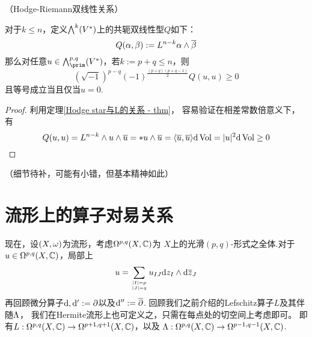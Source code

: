 \begin{thm}（Hodge-Riemann双线性关系）
\label{HRR-局部-thm}

对于$k\leq n$，定义$\bigwedge\nolimits^{k}(V^*)$上的共轭双线性型$Q$如下：
$$Q(\alpha,\beta):=L^{n-k}\alpha\wedge\overline{\beta}$$
那么对任意$u\in \wedgeform{p,q}_{\prim}(V^*)$，若$k:=p+q\leq n$，则
$$(\sqrt{-1})^{p-q}(-1)^{\frac{(p+q)(p+q-1)}{2}}Q(u,u)\geq 0$$
且等号成立当且仅当$u=0$.
\end{thm}

\begin{proof}利用定理\ref{Hodge star与L的关系 - thm}，
容易验证在相差常数倍意义下，有%
$$Q(u,u)=L^{n-k}\wedge u\wedge\overline{u}
=*u\wedge\overline{u}=\langle\overline{u},\overline{u}\rangle\mathrm{d}\operatorname{Vol}
=|u|^2\mathrm{d}\operatorname{Vol}\geq 0$$%
\end{proof}

{\color{blue}（细节待补，可能有小错，但基本精神如此）}



\section{\Kahler 流形上的算子对易关系}


现在，设$(X,\omega)$为\Kahler 流形，考虑$\Omega^{p,q}(X,\mathbb{C})$为
$X$上的光滑$(p,q)$-形式之全体.对于$u\in\Omega^{p,q}(X,\mathbb{C})$，局部上
$$
  u=\sum_{|I|=p\atop |J|=q}
    u_{IJ}\mathrm{d} z_I\wedge\mathrm{d}\overline{z}_J
$$
再回顾微分算子$\mathrm{d},\mathrm{d}':=\partial$以及$\mathrm{d}'':=\overline{\partial}$.
回顾我们之前介绍的Lefschitz算子$L$及其伴随$\Lambda$，
我们在Hermite流形上也可定义之，只需在每点处的切空间上考虑即可。
即有$L:\Omega^{p,q}(X,\mathbb{C})\to\Omega^{p+1,q+1}(X,\mathbb{C})$，以及
$\Lambda:\Omega^{p,q}(X,\mathbb{C})\to\Omega^{p-1,q-1}(X,\mathbb{C})$.


